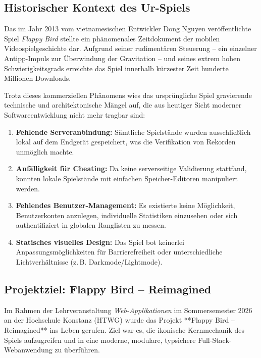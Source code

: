 \documentclass[12pt,a4paper]{article}
\begin{document}
\subsection{Historischer Kontext des Ur-Spiels}
Das im Jahr 2013 vom vietnamesischen Entwickler Dong Nguyen veröffentlichte Spiel \textit{Flappy Bird} stellte ein phänomenales Zeitdokument der mobilen Videospielgeschichte dar. Aufgrund seiner rudimentären Steuerung -- ein einzelner Antipp-Impuls zur Überwindung der Gravitation -- und seines extrem hohen Schwierigkeitsgrads erreichte das Spiel innerhalb kürzester Zeit hunderte Millionen Downloads. 

Trotz dieses kommerziellen Phänomens wies das ursprüngliche Spiel gravierende technische und architektonische Mängel auf, die aus heutiger Sicht moderner Softwareentwicklung nicht mehr tragbar sind:
﻿\begin{enumerate}
  \item \textbf{Fehlende Serveranbindung:} Sämtliche Spielstände wurden ausschließlich lokal auf dem Endgerät gespeichert, was die Verifikation von Rekorden unmöglich machte.
  \item \textbf{Anfälligkeit für Cheating:} Da keine serverseitige Validierung stattfand, konnten lokale Spielstände mit einfachen Speicher-Editoren manipuliert werden.
  \item \textbf{Fehlendes Benutzer-Management:} Es existierte keine Möglichkeit, Benutzerkonten anzulegen, individuelle Statistiken einzusehen oder sich authentifiziert in globalen Ranglisten zu messen.
  \item \textbf{Statisches visuelles Design:} Das Spiel bot keinerlei Anpassungsmöglichkeiten für Barrierefreiheit oder unterschiedliche Lichtverhältnisse (z.\,B. Darkmode/Lightmode).
\end{enumerate}

\subsection{Projektziel: Flappy Bird -- Reimagined}
Im Rahmen der Lehrveranstaltung \textit{Web-Applikationen} im Sommersemester 2026 an der Hochschule Konstanz (HTWG) wurde das Projekt **Flappy Bird -- Reimagined** ins Leben gerufen. Ziel war es, die ikonische Kernmechanik des Spiels aufzugreifen und in eine moderne, modulare, typsichere Full-Stack-Webanwendung zu überführen.
\end{document}
